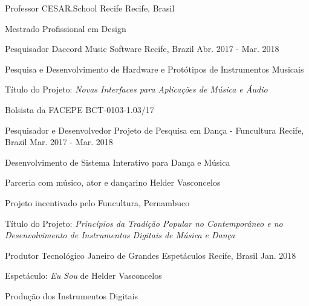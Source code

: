 \begin{cventries}
\cventry
	{Professor}
	{CESAR.School Recife}
	{Recife, Brasil}
	{}
	{
	\begin{cvitems}
		\item{Mestrado Profissional em Design}
	\end{cvitems}
	\begin{cvsubentries}
        \cvsubentry{}{}{}{}
    \end{cvsubentries}
    }

\cventry
	{Pesquisador}
	{Daccord Music Software}
	{Recife, Brazil}
	{Abr. 2017 - Mar. 2018}
	{\begin{cvitems}
		\item{Pesquisa e Desenvolvimento de Hardware e Protótipos de Instrumentos Musicais}
		\item{Título do Projeto: \textit{Novas Interfaces para Aplicações de Música e Áudio}}
		\item{Bolsista da FACEPE BCT-0103-1.03/17}
	\end{cvitems}}

\cventry
	{Pesquisador e Desenvolvedor}
	{Projeto de Pesquisa em Dança - Funcultura}
	{Recife, Brazil}
	{Mar. 2017 - Mar. 2018}
	{\begin{cvitems}
		\item{Desenvolvimento de Sistema Interativo para Dança e Música}
		\item{Parceria com músico, ator e dançarino Helder Vasconcelos}
		\item{Projeto incentivado pelo Funcultura, Pernambuco}
		\item{Título do Projeto: \textit{Princípios da Tradição Popular no Contemporâneo e no Desenvolvimento de Instrumentos Digitais de Música e Dança}}
	\end{cvitems}}

\cventry
	{Produtor Tecnológico}
	{Janeiro de Grandes Espetáculos}
	{Recife, Brasil}
	{Jan. 2018}
	{\begin{cvitems}
		\item{Espetáculo: \textit{Eu Sou} de Helder Vasconcelos}
		\item{Produção dos Instrumentos Digitais}
	\end{cvitems}}


\end{cventries}
